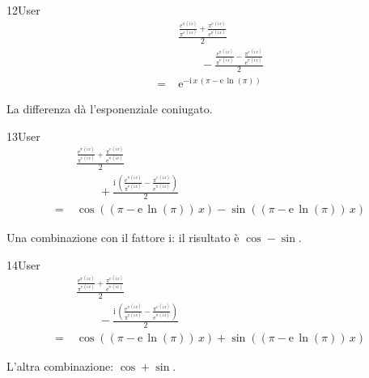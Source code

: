 \begin{espr}{12}{User}{\verificata}
\begin{align*}
& \frac{\frac{\mathrm{e}^{\pi\, \left(\mathrm{i}\, x\right)}}{\pi^{\mathrm{e}\, \left(\mathrm{i}\, x\right)}} + \frac{\pi^{\mathrm{e}\, \left(\mathrm{i}\, x\right)}}{\mathrm{e}^{\pi\, \left(\mathrm{i}\, x\right)}}}{2} \\
&\qquad - \frac{\frac{\mathrm{e}^{\pi\, \left(\mathrm{i}\, x\right)}}{\pi^{\mathrm{e}\, \left(\mathrm{i}\, x\right)}} - \frac{\pi^{\mathrm{e}\, \left(\mathrm{i}\, x\right)}}{\mathrm{e}^{\pi\, \left(\mathrm{i}\, x\right)}}}{2} \\
=\;& \mathrm{e}^{-\mathrm{i}\, x\, \left(\pi - \mathrm{e}\, \ln\!\left(\pi\right)\right)}
\end{align*}
\end{espr}
La differenza dà l'esponenziale coniugato.

\begin{espr}{13}{User}{\verificata}
\begin{align*}
& \frac{\frac{\mathrm{e}^{\pi\, \left(\mathrm{i}\, x\right)}}{\pi^{\mathrm{e}\, \left(\mathrm{i}\, x\right)}} + \frac{\pi^{\mathrm{e}\, \left(\mathrm{i}\, x\right)}}{\mathrm{e}^{\pi\, \left(\mathrm{i}\, x\right)}}}{2} \\
&\qquad + \frac{\mathrm{i}\, \left(\frac{\mathrm{e}^{\pi\, \left(\mathrm{i}\, x\right)}}{\pi^{\mathrm{e}\, \left(\mathrm{i}\, x\right)}} - \frac{\pi^{\mathrm{e}\, \left(\mathrm{i}\, x\right)}}{\mathrm{e}^{\pi\, \left(\mathrm{i}\, x\right)}}\right)}{2} \\
=\;& \cos\!\left(\left(\pi - \mathrm{e}\, \ln\!\left(\pi\right)\right)\, x\right) - \sin\!\left(\left(\pi - \mathrm{e}\, \ln\!\left(\pi\right)\right)\, x\right)
\end{align*}
\end{espr}
Una combinazione con il fattore $\mathrm{i}$: il risultato è $\cos-\sin$.

\begin{espr}{14}{User}{\verificata}
\begin{align*}
& \frac{\frac{\mathrm{e}^{\pi\, \left(\mathrm{i}\, x\right)}}{\pi^{\mathrm{e}\, \left(\mathrm{i}\, x\right)}} + \frac{\pi^{\mathrm{e}\, \left(\mathrm{i}\, x\right)}}{\mathrm{e}^{\pi\, \left(\mathrm{i}\, x\right)}}}{2} \\
&\qquad - \frac{\mathrm{i}\, \left(\frac{\mathrm{e}^{\pi\, \left(\mathrm{i}\, x\right)}}{\pi^{\mathrm{e}\, \left(\mathrm{i}\, x\right)}} - \frac{\pi^{\mathrm{e}\, \left(\mathrm{i}\, x\right)}}{\mathrm{e}^{\pi\, \left(\mathrm{i}\, x\right)}}\right)}{2} \\
=\;& \cos\!\left(\left(\pi - \mathrm{e}\, \ln\!\left(\pi\right)\right)\, x\right) + \sin\!\left(\left(\pi - \mathrm{e}\, \ln\!\left(\pi\right)\right)\, x\right)
\end{align*}
\end{espr}
L'altra combinazione: $\cos+\sin$.



